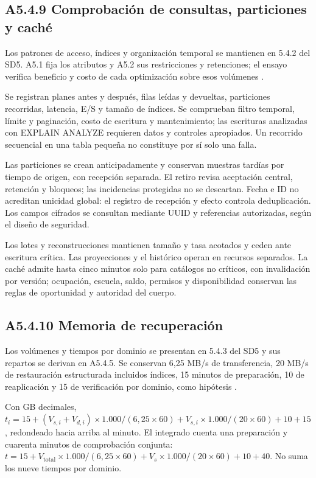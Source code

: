 \subsection*{A5.4.9 Comprobación de consultas, particiones y caché}

Los patrones de acceso, índices y organización temporal se mantienen en 5.4.2 del SD5. A5.1 fija los atributos y A5.2 sus restricciones y retenciones; el ensayo verifica beneficio y costo de cada optimización sobre esos volúmenes \parencite{pg-multicolumn,pg-partial-indexes,pg-partitioning,pg-explain}.

Se registran planes antes y después, filas leídas y devueltas, particiones recorridas, latencia, E/S y tamaño de índices. Se comprueban filtro temporal, límite y paginación, costo de escritura y mantenimiento; las escrituras analizadas con EXPLAIN ANALYZE requieren datos y controles apropiados. Un recorrido secuencial en una tabla pequeña no constituye por sí solo una falla.

Las particiones se crean anticipadamente y conservan muestras tardías por tiempo de origen, con recepción separada. El retiro revisa aceptación central, retención y bloqueos; las incidencias protegidas no se descartan. Fecha e ID no acreditan unicidad global: el registro de recepción y efecto controla deduplicación. Los campos cifrados se consultan mediante UUID y referencias autorizadas, según el diseño de seguridad.

Los lotes y reconstrucciones mantienen tamaño y tasa acotados y ceden ante escritura crítica. Las proyecciones y el histórico operan en recursos separados. La caché admite hasta cinco minutos solo para catálogos no críticos, con invalidación por versión; ocupación, escuela, saldo, permisos y disponibilidad conservan las reglas de oportunidad y autoridad del cuerpo.

\subsection*{A5.4.10 Memoria de recuperación}

Los volúmenes y tiempos por dominio se presentan en 5.4.3 del SD5 y sus repartos se derivan en A5.4.5. Se conservan 6,25 MB/s de transferencia, 20 MB/s de restauración estructurada incluidos índices, 15 minutos de preparación, 10 de reaplicación y 15 de verificación por dominio, como hipótesis \parencite[RT-07.12--RT-07.13]{pucv-bases-transversales}.

Con GB decimales, \(t_i=15+(V_{s,i}+V_{d,i})\times1.000/(6{,}25\times60)+V_{s,i}\times1.000/(20\times60)+10+15\), redondeado hacia arriba al minuto. El integrado cuenta una preparación y cuarenta minutos de comprobación conjunta: \(t=15+V_{\mathrm{total}}\times1.000/(6{,}25\times60)+V_s\times1.000/(20\times60)+10+40\). No suma los nueve tiempos por dominio.

